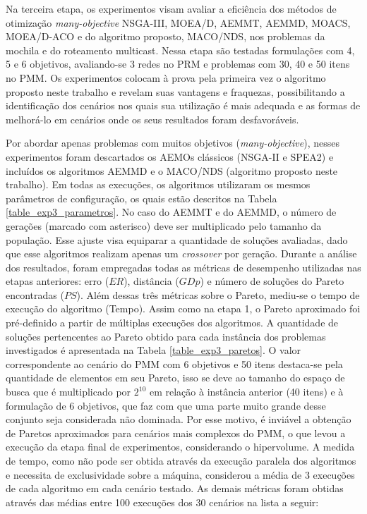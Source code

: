 Na terceira etapa, os experimentos visam avaliar a eficiência dos métodos de otimização \textit{many-objective} NSGA-III, MOEA/D, AEMMT, AEMMD, MOACS, MOEA/D-ACO e do algoritmo proposto, MACO/NDS, nos problemas da mochila e do roteamento multicast. Nessa etapa são testadas formulações com 4, 5 e 6 objetivos, avaliando-se 3 redes no PRM e problemas com 30, 40 e 50 itens no PMM. Os experimentos colocam à prova pela primeira vez o algoritmo proposto neste trabalho e revelam suas vantagens e fraquezas, possibilitando a identificação dos cenários nos quais sua utilização é mais adequada e as formas de melhorá-lo em cenários onde os seus resultados foram desfavoráveis.

Por abordar apenas problemas com muitos objetivos (\textit{many-objective}), nesses experimentos foram descartados os AEMOs clássicos (NSGA-II e SPEA2) e incluídos os algoritmos AEMMD e o MACO/NDS (algoritmo proposto neste trabalho). Em todas as execuções, os algoritmos utilizaram os mesmos parâmetros de configuração, os quais estão descritos na Tabela \ref{table_exp3_parametros}. No caso do AEMMT e do AEMMD, o número de gerações (marcado com asterisco) deve ser multiplicado pelo tamanho da população. Esse ajuste visa equiparar a quantidade de soluções avaliadas, dado que esse algoritmos realizam apenas um \textit{crossover} por geração. Durante a análise dos resultados, foram empregadas todas as métricas de desempenho utilizadas nas etapas anteriores: erro ($ER$),  distância ($GDp$) e número de soluções do Pareto encontradas ($PS$). Além dessas três métricas sobre o Pareto, mediu-se o tempo de execução do algoritmo (Tempo). Assim como na etapa 1, o Pareto aproximado foi pré-definido a partir de múltiplas execuções dos algoritmos. A quantidade de soluções pertencentes ao Pareto obtido para cada instância dos problemas investigados é apresentada na Tabela \ref{table_exp3_paretos}. O valor correspondente ao cenário do PMM com 6 objetivos e 50 itens destaca-se pela quantidade de elementos em seu Pareto, isso se deve ao tamanho do espaço de busca que é multiplicado por $2^10$ em relação à instância anterior (40 itens) e à formulação de 6 objetivos, que faz com que uma parte muito grande desse conjunto seja considerada não dominada. Por esse motivo, é inviável a obtenção de Paretos aproximados para cenários mais complexos do PMM, o que levou a execução da etapa final de experimentos, considerando o hipervolume. A medida de tempo, como não pode ser obtida através da execução paralela dos algoritmos e necessita de exclusividade sobre a máquina, considerou a média de 3 execuções de cada algoritmo em cada cenário testado. As demais métricas foram obtidas através das médias entre 100 execuções dos 30 cenários na lista a seguir:

